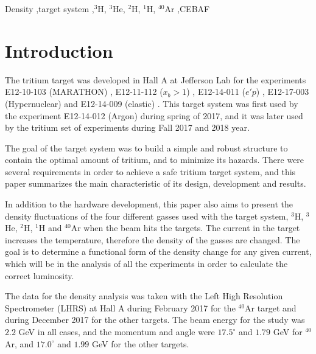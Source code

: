 \documentclass[final,5p,times,twocolumn,balance]{elsarticle}
\begin{document}
\begin{frontmatter}
\begin{abstract}
  
\end{abstract}

\begin{keyword}
Density \sep target system
\sep $^{3}$H, $^{3}$He, $^{2}$H, $^{1}$H, $^{40}$Ar
\sep CEBAF
\end{keyword}
\end{frontmatter}


\section{Introduction}
\label{}

The tritium target was developed in Hall A at Jefferson Lab for the experiments E12-10-103 (MARATHON) \cite{marathon}, E12-11-112 ($x_{b}>1$) \cite{E12-11-112}, E12-14-011 ($e'p$) \cite{E12-14-011}, E12-17-003 (Hypernuclear) \cite{hypernuclear} and E12-14-009 (elastic) \cite{E12-14-009}. This target system was first used by the experiment E12-14-012 (Argon) \cite{E12-14-012} during spring of 2017, and it was later used by the tritium set of experiments during  Fall 2017 and  2018 year. 

The goal of the target system was to build a simple and robust structure to contain the optimal amount of tritium, and to minimize 
its hazards. There were several requirements in order to achieve a safe tritium target system, and this paper summarizes the main characteristic 
of its design, development and results. 

In addition to the hardware development, this paper also aims to present the density fluctuations of the four different gasses used 
with the target system, $^{3}$H, $^{3}$He, $^{2}$H, $^{1}$H and $^{40}$Ar when the beam hits the targets. The current in the target 
increases the temperature, therefore the density of the gasses are changed. The goal is to determine a functional form of the density 
change for any given current, which will be in the analysis of all the experiments in order to calculate the correct luminosity.

The data for the density analysis was taken with the Left High Resolution Spectrometer (LHRS) at Hall A during February 2017 
for the $^{40}$Ar target and during December 2017 for the other targets. The beam energy for the study was $2.2$ GeV in all 
cases, and the momentum and angle were $17.5 ^\circ $ and $1.79$ GeV for $^{40}$Ar, and $17.0 ^\circ $ and $1.99$ GeV for 
the other targets.
\end{document}
